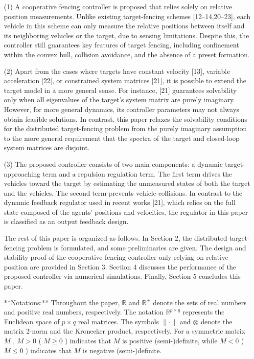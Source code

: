 (1) A cooperative fencing controller is proposed that relies solely on relative position measurements. Unlike existing target-fencing schemes [12–14,20–23], each vehicle in this scheme can only measure the relative positions between itself and its neighboring vehicles or the target, due to sensing limitations. Despite this, the controller still guarantees key features of target fencing, including confinement within the convex hull, collision avoidance, and the absence of a preset formation.

(2) Apart from the cases where targets have constant velocity [13], variable acceleration [22], or constrained system matrices [21], it is possible to extend the target model in a more general sense. For instance, [21] guarantees solvability only when all eigenvalues of the target's system matrix are purely imaginary. However, for more general dynamics, its controller parameters may not always obtain feasible solutions. In contrast, this paper relaxes the solvability conditions for the distributed target-fencing problem from the purely imaginary assumption to the more general requirement that the spectra of the target and closed-loop system matrices are disjoint.

(3) The proposed controller consists of two main components: a dynamic target-approaching term and a repulsion regulation term. The first term drives the vehicles toward the target by estimating the unmeasured states of both the target and the vehicles. The second term prevents vehicle collisions. In contrast to the dynamic feedback regulator used in recent works [21], which relies on the full state composed of the agents' positions and velocities, the regulator in this paper is classified as an output feedback design.

The rest of this paper is organized as follows. In Section 2, the distributed target-fencing problem is formulated, and some preliminaries are given. The design and stability proof of the cooperative fencing controller only relying on relative position are provided in Section 3. Section 4 discusses the performance of the proposed controller via numerical simulations. Finally, Section 5 concludes this paper.

**Notations:** Throughout the paper,  $\mathbb{R}$  and  $\mathbb{R}^+$  denote the sets of real numbers and positive real numbers, respectively. The notation  $\mathbb{R}^{p \times q}$  represents the Euclidean space of  $p \times q$  real matrices. The symbols  $\|\cdot\|$  and  $\otimes$  denote the matrix 2-norm and the Kronecker product, respectively. For a symmetric matrix  $M$ ,  $M > 0$  ( $M \geq 0$ ) indicates that  $M$  is positive (semi-)definite, while  $M < 0$  ( $M \leq 0$ ) indicates that  $M$  is negative (semi-)definite.

